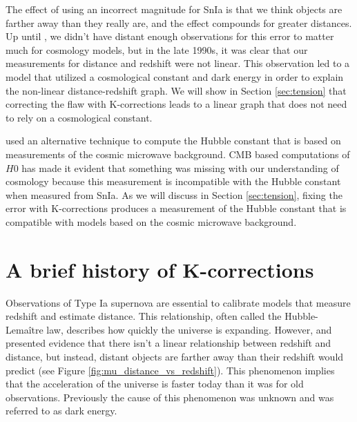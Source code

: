 \documentclass[linenumbers]{aastex631}
\begin{document}
The effect of using an incorrect magnitude for SnIa is that we think objects
are farther away than they really are, and the effect compounds for greater
distances. Up until \citet{riess1998}, we didn't have distant enough
observations for this error to matter much for cosmology models, but in the
late 1990s, it was clear that our measurements for distance and redshift were
not linear. This observation led to a model that utilized a cosmological
constant and dark energy in order to explain the non-linear distance-redshift
graph. We will show in Section \ref{sec:tension} that correcting the flaw
with K-corrections leads to a linear graph that does not need to rely on a
cosmological constant.

\citet{planck2020} used an alternative technique to compute the Hubble constant
that is based on measurements of the cosmic microwave background. CMB based
computations of $H0$ has made it evident that something was missing with our
understanding of cosmology because this measurement is incompatible with the
Hubble constant when measured from SnIa. As we will discuss in Section
\ref{sec:tension}, fixing the error with K-corrections produces a measurement
of the Hubble constant that is compatible with models based on the cosmic
microwave background.

\section{A brief history of K-corrections}
\label{sec:history}

Observations of Type Ia supernova are essential to calibrate models that
measure redshift and estimate distance. This relationship, often called the
Hubble-Lema\^{i}tre law, describes how quickly the universe is expanding.
However, \citet{riess1998} and \citet{perlmutter1999} presented evidence that
there isn't a linear relationship between redshift and distance, but instead,
distant objects are farther away than their redshift would predict (see Figure
\ref{fig:mu_distance_vs_redshift}). This phenomenon implies that the
acceleration of the universe is faster today than it was for old observations.
Previously the cause of this phenomenon was unknown and was referred to as
dark energy.
\end{document}
